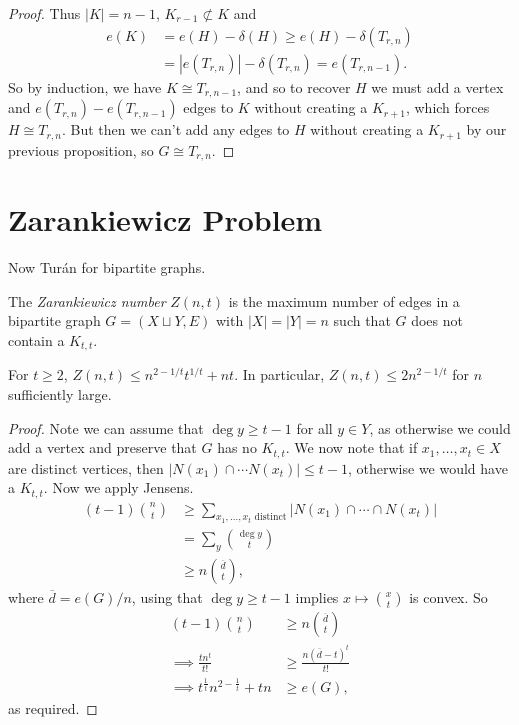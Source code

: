 \documentclass[a3paper, 10pt]{article}
\renewcommand{\vocab}[1]{\emph{#1}}
\begin{document}
\begin{multicols*}{5}
\begin{proof}
    Thus $|K| = n - 1$, $K_{r - 1} \not \subset K$ and
    \begin{align*}
e(K) &= e(H) - \delta(H) \geq e(H) - \delta(T_{r, n}) \\
&= |e(T_{r, n})| - \delta(T_{r, n}) = e(T_{r, n-1}).
    \end{align*}
    So by induction, we have $K \cong T_{r, n - 1}$, and so to recover $H$ we must add a vertex and $e(T_{r, n}) - e(T_{r, n - 1})$ edges to $K$ without creating a $K_{r + 1}$, which forces $H \cong T_{r, n}$. But then we can't add any edges to $H$ without creating a $K_{r + 1}$ by our previous proposition, so $G \cong T_{r, n}$.
\end{proof}

\section{Zarankiewicz Problem}

Now Turán for bipartite graphs.

\begin{definition}
    The \vocab{Zarankiewicz number} $Z(n, t)$ is the maximum number of edges in a bipartite graph $G = (X \sqcup Y, E)$ with $|X| = |Y| = n$ such that $G$ does not contain a $K_{t, t}$.
\end{definition}

\begin{theorem}
    For $t \geq 2$, $Z(n, t) \leq n^{2 - 1/t} t^{1/t} + nt$. In particular, $Z(n, t) \leq 2n^{2 - 1/t}$ for $n$ sufficiently large.
\end{theorem}
\begin{proof}
    Note we can assume that $\deg y \geq t - 1$ for all $y \in Y$, as otherwise we could add a vertex and preserve that $G$ has no $K_{t, t}$. We now note that if $x_1, \dots, x_t \in X$ are distinct vertices, then $|N(x_1) \cap \cdots N(x_t)| \leq t - 1$, otherwise we would have a $K_{t, t}$. Now we apply Jensens.
    \begin{align*}
        (t - 1) \binom{n}{t} &\geq \sum_{x_1, \dots, x_t \text{ distinct}} |N(x_1) \cap \cdots \cap N(x_t)| \\
        &= \sum_{y} \binom{\deg y}{t} \\
        &\geq n \binom{\overline{d}}{t},
    \end{align*}
    where $\overline{d} = e(G)/n$, using that $\deg y \geq t - 1$ implies $x \mapsto \binom{x}{t}$ is convex. So
    \begin{align*}
        (t - 1)\binom{n}{t} &\geq n \binom{\overline{d}}{t} \\
\implies \frac{t n^t}{t!} &\geq \frac{n(\overline{d} - t)^t}{t!} \\
\implies t^{\frac{1}{t}}n^{2 - \frac{1}{t}} + tn &\geq e(G),
    \end{align*}
    as required.
\end{proof}


\end{multicols*}
\end{document}
